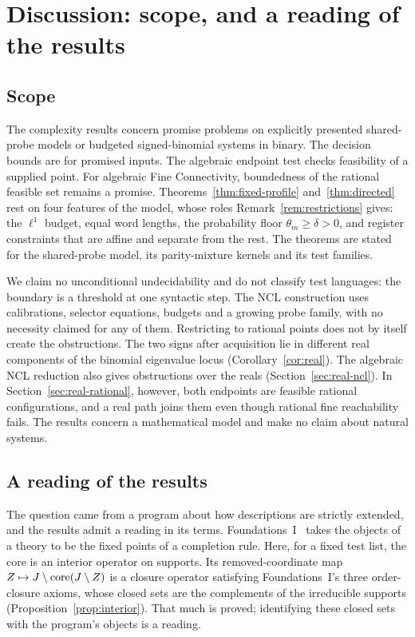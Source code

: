 
\section{Discussion: scope, and a reading of the results}\label{sec:discussion}

\subsection{Scope}\label{sec:scope}

The complexity results concern promise problems on explicitly presented
shared-probe models or budgeted signed-binomial systems in binary.
The decision bounds are for promised inputs. The algebraic endpoint test
checks feasibility of a supplied point. For algebraic Fine Connectivity,
boundedness of the rational feasible set remains a promise.
Theorems~\ref{thm:fixed-profile} and~\ref{thm:directed} rest on four
features of the model, whose roles Remark~\ref{rem:restrictions} gives: the
$\ell^1$ budget, equal word lengths, the probability floor
$\theta_m\ge\delta>0$, and register constraints that are affine and
separate from the rest.
The theorems are stated for the shared-probe model, its parity-mixture
kernels and its test families.

We claim no unconditional undecidability and do not classify test
languages: the boundary is a threshold at one syntactic step. The NCL construction uses calibrations, selector equations,
budgets and a growing probe family, with no necessity claimed for any of
them.
Restricting to rational points does not by itself create the obstructions.
The two signs after acquisition lie in different real components of the
binomial eigenvalue locus (Corollary~\ref{cor:real}). The algebraic NCL
reduction also gives obstructions over the reals
(Section~\ref{sec:real-ncl}). In Section~\ref{sec:real-rational}, however,
both endpoints are feasible rational configurations, and a real path joins
them even though rational fine reachability fails. The results concern a mathematical model and
make no claim about natural systems.

\subsection{A reading of the results}\label{sec:reading}

The question came from a program about how descriptions are strictly
extended, and the results admit a reading in its terms.
Foundations~I~\cite[Sections~4.1--4.2]{foundations1} takes the objects of a
theory to be the fixed points of a completion rule. Here, for a fixed
test list, the core is an interior operator on supports. Its
removed-coordinate map $Z\mapsto J\setminus\operatorname{core}(J\setminus Z)$ is a
closure operator satisfying Foundations~I's three order-closure axioms,
whose closed sets are the complements of the irreducible supports
(Proposition~\ref{prop:interior}). That much is proved; identifying these closed sets with the program's
objects is a reading.

